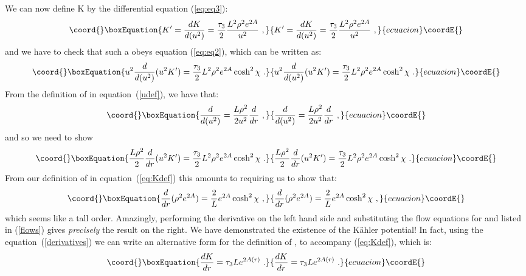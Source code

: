 \documentclass[a4paper,12pt]{article}
\providecommand{\labell}[1]{\label{#1}}
\providecommand{\reef}[1]{(\ref{#1})}
\begin{document}
We can now define K by the differential equation (\ref{eq:eq3}):
\begin{equation}\coord{}\boxEquation{
  K'=\frac{dK}{d(u^2)} = \frac{\tau_3}{2} \frac{L^2 \rho^2 e^{2A}}{u^2}\ ,
  \labell{eq:Kdef}
}{
  K'=\frac{dK}{d(u^2)} = \frac{\tau_3}{2} \frac{L^2 \rho^2 e^{2A}}{u^2}\ ,
  \labell{eq:Kdef}
}{ecuacion}\coordE{}\end{equation}
and we have to check that such a \coordHE{} obeys equation (\ref{eq:eq2}),
which can be written as:
\begin{equation}\coord{}\boxEquation{
  u^2 \frac{d}{d(u^2)} (u^2 K') = 
\frac{\tau_3}{2} L^2 \rho^2 e^{2A} \cosh^2 \chi\ .
}{
  u^2 \frac{d}{d(u^2)} (u^2 K') = 
\frac{\tau_3}{2} L^2 \rho^2 e^{2A} \cosh^2 \chi\ .
}{ecuacion}\coordE{}\end{equation}
{}From the definition of \coordHE{} in equation~\reef{udef}, we have that:
\begin{equation}\coord{}\boxEquation{
  \frac{d}{d(u^2)} = \frac{L \rho^2}{2 u^2} \frac{d}{dr}\ ,
  \labell{derivatives}
}{
  \frac{d}{d(u^2)} = \frac{L \rho^2}{2 u^2} \frac{d}{dr}\ ,
  \labell{derivatives}
}{ecuacion}\coordE{}\end{equation}
and so we need to show
\begin{equation}\coord{}\boxEquation{
  \frac{L \rho^2}{2} \frac{d}{dr} (u^2 K') 
= \frac{\tau_3}{2} L^2 \rho^2 e^{2A} \cosh^2 \chi\ .
  \labell{eq:toprove}
}{
  \frac{L \rho^2}{2} \frac{d}{dr} (u^2 K') 
= \frac{\tau_3}{2} L^2 \rho^2 e^{2A} \cosh^2 \chi\ .
  \labell{eq:toprove}
}{ecuacion}\coordE{}\end{equation}
{}From our definition of \coordHE{} in equation~(\ref{eq:Kdef}) this amounts to
requiring us to show that:
\begin{equation}\coord{}\boxEquation{
  \frac{d}{dr} ( \rho^2 e^{2A}) =  \frac{2}{L }  e^{2A} \cosh^2 \chi\ ,
}{
  \frac{d}{dr} ( \rho^2 e^{2A}) =  \frac{2}{L }  e^{2A} \cosh^2 \chi\ ,
}{ecuacion}\coordE{}\end{equation}
which seems like a tall order.  Amazingly, performing the derivative
on the left hand side and substituting the flow equations for
\coordHE{} and \coordHE{} listed in \reef{flows} gives {\it precisely} the
result on the right. We have demonstrated the existence of the
K\"ahler potential! In fact, using the equation~\reef{derivatives} we
can write an alternative form for the definition of \coordHE{}, to accompany
\reef{eq:Kdef}, which is:
\begin{equation}\coord{}\boxEquation{
  \frac{dK}{dr}={\tau_3}{L}e^{2A(r)}\ .
  \labell{niceK}
}{
  \frac{dK}{dr}={\tau_3}{L}e^{2A(r)}\ .
  \labell{niceK}
}{ecuacion}\coordE{}\end{equation}
\end{document}
